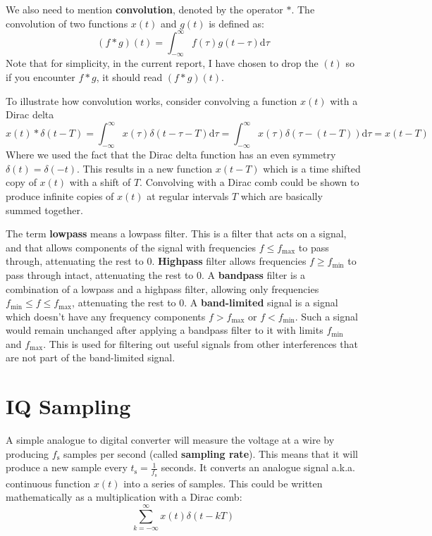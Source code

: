 \documentclass[a4paper,12pt,twoside,openright]{report}
\begin{document}
We also need to mention \textbf{convolution}, denoted by the operator $\ast$. The convolution of two functions $x(t)$ and $g(t)$ is defined as:
$$(f \ast g)(t) = \int_{-\infty}^{\infty} f(\tau) g(t - \tau) \text{d} \tau$$
Note that for simplicity, in the current report, I have chosen to drop the $(t)$ so if you encounter $f \ast g$, it should read $(f \ast g)(t)$.

To illustrate how convolution works, consider convolving a function $x(t)$ with a Dirac delta
$$ x(t) \ast \delta(t-T) =  \int_{-\infty}^{\infty} x(\tau) \delta(t - \tau - T ) \text{d} \tau = \int_{-\infty}^{\infty} x(\tau) \delta( \tau - ( t -T) ) \text{d} \tau = x(t-T)$$
Where we used the fact that the Dirac delta function has an even symmetry $\delta(t) = \delta(-t)$. This results in a new function $x(t-T)$ which is a time shifted copy of $x(t)$ with a shift of $T$. Convolving with a Dirac comb could be shown to produce infinite copies of $x(t)$ at regular intervals $T$ which are basically summed together.

The term \textbf{lowpass} means a lowpass filter. This is a filter that acts on a signal, and that allows components of the signal with frequencies $f \leq f_\text{max}$ to pass through, attenuating the rest to 0. \textbf{Highpass} filter allows frequencies $f \geq f_\text{min}$ to pass through intact, attenuating the rest to 0. A \textbf{bandpass} filter is a combination of a lowpass and a highpass filter, allowing only frequencies $f_\text{min} \leq f \leq f_\text{max}$, attenuating the rest to 0. A \textbf{band-limited} signal is a signal which doesn't have any frequency components $f > f_\text{max}$ or $f < f_\text{min}$. Such a signal would remain unchanged after applying a bandpass filter to it with limits $f_\text{min}$ and $f_\text{max}$. This is used for filtering out useful signals from other interferences that are not part of the band-limited signal.

\section{IQ Sampling} 
\label{sec:IQSampling}

A simple analogue to digital converter will measure the voltage at a wire by producing $f_\text{s}$ samples per second (called \textbf{sampling rate}). This means that it will produce a new sample every $t_\text{s} = \frac{1}{f_\text{s}}$ seconds. It converts an analogue signal a.k.a. continuous function $x(t)$ into a series of samples. This could be written mathematically as a multiplication with a Dirac comb:
\begin{equation}
\label{eq:sampling}
\sum_{k=-\infty}^{\infty} x(t) \delta(t - kT)
\end{equation}
\end{document}
